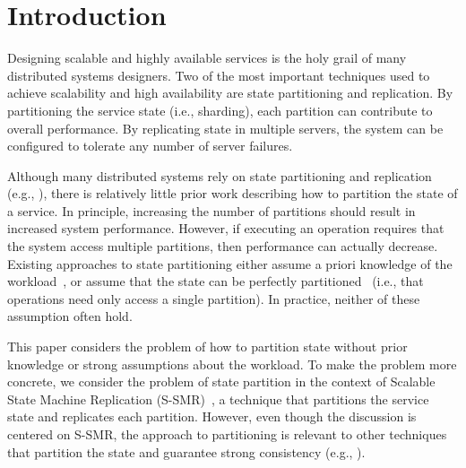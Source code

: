 \section{Introduction}

Designing scalable and highly available services is the holy grail of
many distributed systems designers.  Two of the most important
techniques used to achieve scalability and high availability are state
partitioning and replication.  By partitioning the service state
(i.e., sharding), each partition can contribute to overall
performance. By replicating state in multiple servers, the
system can be configured to tolerate any number of server failures.


Although many distributed systems rely on state partitioning and
replication (e.g., \cite{x,y,z,w}), there is relatively little prior
work describing how to partition the state of a service. In principle,
increasing the number of partitions should result in increased system
performance. However, if executing an operation requires that the
system access multiple partitions, then performance can actually
decrease. Existing approaches to state partitioning either assume a
priori knowledge of the workload~\cite{curino2010sch}, or assume
that the state can be perfectly partitioned~\cite{long16} (i.e., that operations
need only access a single partition). In practice, neither of these
assumption often hold.

This paper considers the problem of how to partition state without
prior knowledge or strong assumptions about the workload.  To make the
problem more concrete, we consider the problem of state partition in
the context of Scalable State Machine Replication (S-SMR)~\cite{ssmr},
a technique that partitions the service state and replicates each
partition.  However, even though the discussion is centered on S-SMR,
the approach to partitioning is relevant to other techniques that
partition the state and guarantee strong consistency (e.g.,
\cite{xxx}).

